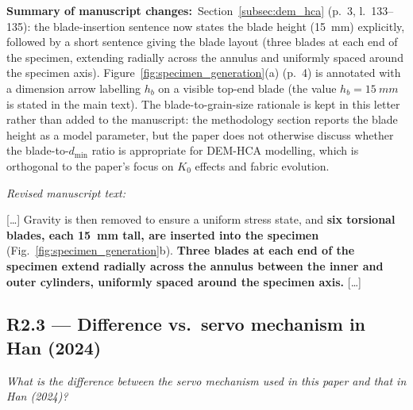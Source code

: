 \documentclass[11pt,a4paper]{article}
\newenvironment{rcomment}
  {\begin{leftbar}\color{black!75}\itshape}
  {\end{leftbar}\vspace{0.3em}}
\newcommand{\changed}[1]{\par\noindent\textbf{Summary of manuscript changes:}\ #1\par}
\newenvironment{revtext}
  {\par\vspace{0.2em}\noindent\textit{Revised manuscript text:}\par
   \begingroup\color{black}\begin{leftbar}\small}
  {\end{leftbar}\endgroup\vspace{0.3em}}
\newcommand{\manref}[1]{(#1)}                  %
\begin{document}
\changed{Section~\ref{subsec:dem_hca} \manref{p.~3, l.~133--135}:
the blade-insertion sentence now states the blade height (\SI{15}{mm})
explicitly, followed by a short sentence giving the blade layout
(three blades at each end of the specimen, extending radially across
the annulus and uniformly spaced around the specimen axis).
Figure~\ref{fig:specimen_generation}(a) \manref{p.~4} is annotated
with a dimension arrow labelling $h_b$ on a visible
top-end blade (the value $h_b=\SI{15}{mm}$ is stated in the main
text).  The blade-to-grain-size rationale
is kept in this letter rather than added to the manuscript: the
methodology section reports the blade height as a model parameter,
but the paper does not otherwise discuss whether the
blade-to-$d_{\min}$ ratio is appropriate for DEM-HCA modelling,
which is orthogonal to the paper's focus on $K_0$ effects and
fabric evolution.}

\begin{revtext}
[\ldots] Gravity is then removed to ensure a uniform stress state,
and \textbf{six torsional blades, each 15~mm tall, are inserted into
the specimen} (Fig.~\ref{fig:specimen_generation}b). \textbf{Three
blades at each end of the specimen extend radially across the
annulus between the inner and outer cylinders, uniformly spaced
around the specimen axis.} [\ldots]
\end{revtext}

\subsection*{R2.3 --- Difference vs.\ servo mechanism in Han (2024)}

\begin{rcomment}
What is the difference between the servo mechanism used in this paper and
that in Han (2024)?
\end{rcomment}
\end{document}
